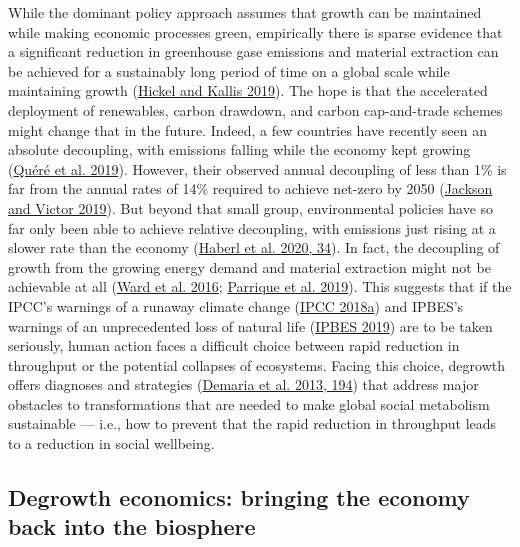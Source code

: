 \documentclass[a4paper, nobind]{templates/ociamthesis}
\begin{document}
While the dominant policy approach assumes that growth can be maintained while making economic processes green, empirically there is sparse evidence that a significant reduction in greenhouse gase emissions and material extraction can be achieved for a sustainably long period of time on a global scale while maintaining growth (\protect\hyperlink{ref-hickel_green_2019}{Hickel and Kallis 2019}). The hope is that the accelerated deployment of renewables, carbon drawdown, and carbon cap-and-trade schemes might change that in the future. Indeed, a few countries have recently seen an absolute decoupling, with emissions falling while the economy kept growing (\protect\hyperlink{ref-quere_drivers_2019}{Quéré et al. 2019}). However, their observed annual decoupling of less than 1\% is far from the annual rates of 14\% required to achieve net-zero by 2050 (\protect\hyperlink{ref-jackson_unraveling_2019}{Jackson and Victor 2019}). But beyond that small group, environmental policies have so far only been able to achieve relative decoupling, with emissions just rising at a slower rate than the economy (\protect\hyperlink{ref-haberl_systematic_2020}{Haberl et al. 2020, 34}). In fact, the decoupling of growth from the growing energy demand and material extraction might not be achievable at all (\protect\hyperlink{ref-ward_decoupling_2016}{Ward et al. 2016}; \protect\hyperlink{ref-parrique_decoupling_2019}{Parrique et al. 2019}). This suggests that if the IPCC's warnings of a runaway climate change (\protect\hyperlink{ref-ipcc_global_2018}{IPCC 2018a}) and IPBES's warnings of an unprecedented loss of natural life (\protect\hyperlink{ref-ipbes_global_2019}{IPBES 2019}) are to be taken seriously, human action faces a difficult choice between rapid reduction in throughput or the potential collapses of ecosystems. Facing this choice, degrowth offers diagnoses and strategies (\protect\hyperlink{ref-demaria_what_2013}{Demaria et al. 2013, 194}) that address major obstacles to transformations that are needed to make global social metabolism sustainable --- i.e., how to prevent that the rapid reduction in throughput leads to a reduction in social wellbeing.

\hypertarget{degrowth-economics-bringing-the-economy-back-into-the-biosphere}{%
\subsection{Degrowth economics: bringing the economy back into the biosphere}\label{degrowth-economics-bringing-the-economy-back-into-the-biosphere}}
\end{document}
